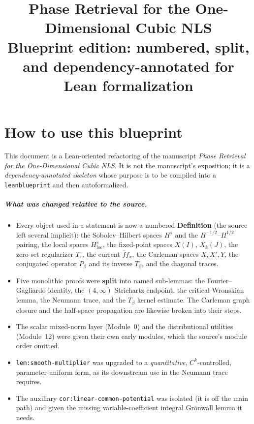 \documentclass[11pt,oneside]{book}
\title{\textbf{Phase Retrieval for the One-Dimensional Cubic NLS}\\[0.4em]
\large Blueprint edition: numbered, split, and dependency-annotated for Lean formalization}
\author{}
\date{}
\theoremstyle{definition}
\theoremstyle{remark}
\newcommand{\1}{\mathbf 1}
\newcommand{\loc}{\mathrm{loc}}
\newcommand{\eps}{\varepsilon}
\begin{document}
\frontmatter
\maketitle

\chapter*{How to use this blueprint}

This document is a Lean-oriented refactoring of the manuscript \emph{Phase Retrieval for the
One-Dimensional Cubic NLS}. It is not the manuscript's exposition; it is a \emph{dependency-annotated skeleton}
whose purpose is to be compiled into a \texttt{leanblueprint} and then autoformalized.

\paragraph{What was changed relative to the source.}
\begin{itemize}
\item Every object used in a statement is now a numbered \textbf{Definition} (the source left several implicit):
      the Sobolev--Hilbert spaces $H^{s}$ and the $H^{-1/2}$--$H^{1/2}$ pairing, the local spaces $H^s_\loc$,
      the fixed-point spaces $X(I)$, $X_k(J)$, the zero-set regularizer $T_\eps$, the current $\overline f f_x$,
      the Carleman spaces $X,X',Y$, the conjugated operator $P_\beta$ and its inverse $T_\beta$, and the
      diagonal traces.
\item Five monolithic proofs were \textbf{split} into named sub-lemmas: the Fourier--Gagliardo identity, the
      $(4,\infty)$ Strichartz endpoint, the critical Wronskian lemma, the Neumann trace, and the $T_\beta$ kernel
      estimate. The Carleman graph closure and the half-space propagation are likewise broken into their steps.
\item The scalar mixed-norm layer (Module~0) and the distributional utilities (Module~12) were given their own
      early modules, which the source's module order omitted.
\item \texttt{lem:smooth-multiplier} was upgraded to a \emph{quantitative}, $C^k$-controlled, parameter-uniform
      form, as its downstream use in the Neumann trace requires.
\item The auxiliary \texttt{cor:linear-common-potential} was isolated (it is off the main path) and given the
      missing variable-coefficient integral Gr\"onwall lemma it needs.
\end{itemize}
\end{document}
